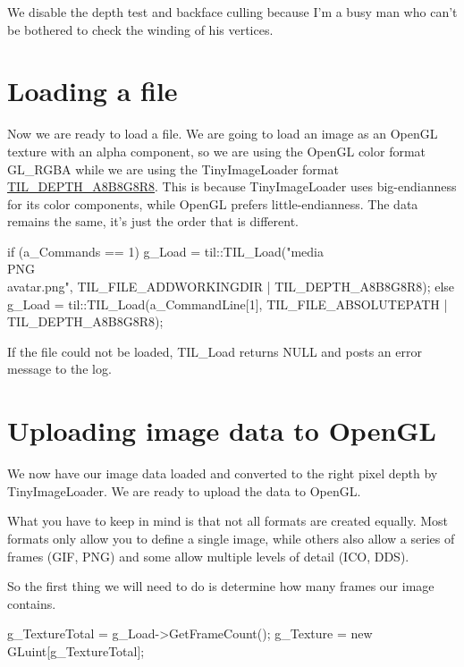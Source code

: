 We disable the depth test and backface culling because I'm a busy man who can't be bothered to check the winding of his vertices.\hypertarget{example1_loading}{}\section{Loading a file}\label{example1_loading}
Now we are ready to load a file. We are going to load an image as an OpenGL texture with an alpha component, so we are using the OpenGL color format GL\_\-RGBA while we are using the TinyImageLoader format \hyperlink{_t_i_l_settings_8h_aa41c714a49a57e84fe823a09e898c074}{TIL\_\-DEPTH\_\-A8B8G8R8}. This is because TinyImageLoader uses big-\/endianness for its color components, while OpenGL prefers little-\/endianness. The data remains the same, it's just the order that is different.


\begin{DoxyCode}
        if (a_Commands == 1)
        {
                g_Load = til::TIL_Load("media\\PNG\\avatar.png", 
      TIL_FILE_ADDWORKINGDIR | TIL_DEPTH_A8B8G8R8);
        }
        else
        {
                g_Load = til::TIL_Load(a_CommandLine[1], TIL_FILE_ABSOLUTEPATH | 
      TIL_DEPTH_A8B8G8R8);
        }
\end{DoxyCode}


If the file could not be loaded, TIL\_\-Load returns NULL and posts an error message to the log.\hypertarget{example1_uploading}{}\section{Uploading image data to OpenGL}\label{example1_uploading}
We now have our image data loaded and converted to the right pixel depth by TinyImageLoader. We are ready to upload the data to OpenGL.

What you have to keep in mind is that not all formats are created equally. Most formats only allow you to define a single image, while others also allow a series of frames (GIF, PNG) and some allow multiple levels of detail (ICO, DDS).

So the first thing we will need to do is determine how many frames our image contains.


\begin{DoxyCode}
        g_TextureTotal = g_Load->GetFrameCount();
        g_Texture = new GLuint[g_TextureTotal];
\end{DoxyCode}



